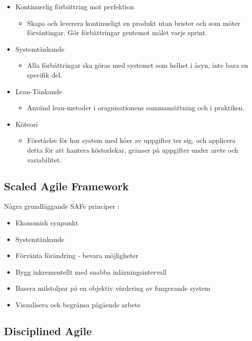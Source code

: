 \begin{itemize}
\begin{itemize}
			\end{itemize}
		\item Kontinuerlig förbättring mot perfektion
			\begin{itemize}
				\item Skapa och leverera kontinueligt en produkt utan brister och som möter förväntingar. Gör förbättringar gentemot målet varje sprint.
			\end{itemize}
		\item Systemtänkande
			\begin{itemize}
				\item Alla förbättringar ska göras med systemet som helhet i åsyn, inte bara en specifik del.
			\end{itemize}
		\item Lean-Tänkande
			\begin{itemize}
				\item Använd lean-metoder i oragnisationens sammansättning och i praktiken.
			\end{itemize}
		\item Köteori
			\begin{itemize}
				\item Förståelse för hur system med köer av uppgifter ter sig, och applicera detta för att hantera köstorlekar, gränser på uppgifter under arete och variabilitet.
			\end{itemize}
			
	\end{itemize}
	
	\subsection{Scaled Agile Framework}
	
	
	Några grundläggande SAFe principer \cite{safe_principles}:
	\begin{itemize}
		\item Ekonomisk synpunkt
		\item Systemtänkande
		\item Förvänta förändring - bevara möjligheter
		\item Bygg inkrementellt med snabba inlärningsintervall
		\item Basera milstolpar på en objektiv värdering av fungerande system
		\item Visualisera och begränsa pågående arbete
	\end{itemize}
	
	
	\subsection{Disciplined Agile}
	

